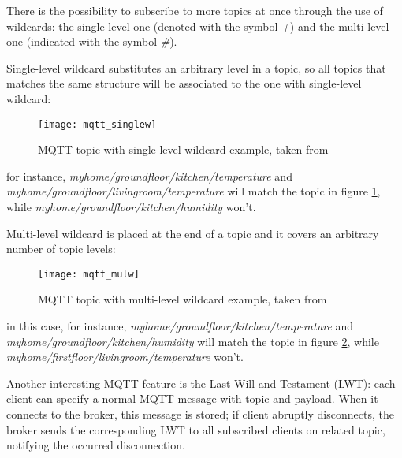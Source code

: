 There is the possibility to subscribe to more topics at once through the use of wildcards: the single-level one (denoted with the symbol \textit{+}) and the multi-level one (indicated with the symbol \textit{\#}).

Single-level wildcard substitutes an arbitrary level in a topic, so all topics that matches the same structure will be associated to the one with single-level wildcard:

\begin{figure}[H]

    \centering
    \texttt{[image: mqtt\_singlew]}
    \caption{MQTT topic with single-level wildcard example, taken from \cite{site:hivemq}}
    \label{fig:mqtt_singlew}

\end{figure}

for instance, \textit{myhome\slash{}groundfloor\slash{}kitchen\slash{}temperature} and \textit{myhome\slash{}\linebreak groundfloor\slash{}livingroom\slash{}temperature} will match the topic in figure \ref{fig:mqtt_singlew}, while \textit{myhome\slash{}groundfloor\slash{}kitchen\slash{}humidity} won't.

Multi-level wildcard is placed at the end of a topic and it covers an arbitrary number of topic levels:

\begin{figure}[H]

    \centering
    \texttt{[image: mqtt\_mulw]}
    \caption{MQTT topic with multi-level wildcard example, taken from \cite{site:hivemq}}
    \label{fig:mqtt_mulw}

\end{figure}

in this case, for instance, \textit{myhome\slash{}groundfloor\slash{}kitchen\slash{}temperature} and \textit{myhome\slash{}groundfloor\slash{}kitchen\slash{}humidity} will match the topic in figure \ref{fig:mqtt_mulw}, while \textit{myhome\slash{}firstfloor\slash{}livingroom\slash{}temperature} won't.

Another interesting MQTT feature is the Last Will and Testament (LWT): each client can specify a normal MQTT message with topic and payload. When it connects to the broker, this message is stored; if client abruptly disconnects, the broker sends the corresponding LWT to all subscribed clients on related topic, notifying the occurred disconnection.





